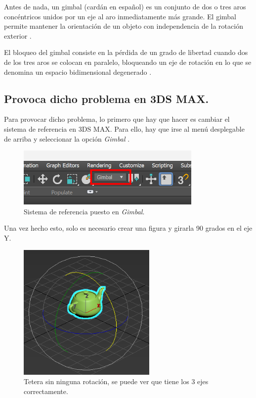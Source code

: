 \documentclass{article}
\begin{document}
Antes de nada, un gimbal (cardán en español) es un conjunto de dos o tres aros concéntricos unidos por un eje al aro inmediatamente más grande. El gimbal permite mantener la orientación de un objeto con independencia de la rotación exterior \cite{eswiki:131649196}.

El bloqueo del gimbal consiste en la pérdida de un grado de libertad cuando dos de los tres aros se colocan en paralelo, bloqueando un eje de rotación en lo que se denomina un espacio bidimensional degenerado \cite{eswiki:119169170}.

\subsection{Provoca dicho problema en 3DS MAX.}

Para provocar dicho problema, lo primero que hay que hacer es cambiar el sistema de referencia en 3DS MAX. Para ello, hay que irse al menú desplegable de arriba y seleccionar la opción \textit{Gimbal} \cite{explicacion}.

\begin{figure}[H]
    \centering
    \includegraphics[width=0.8\textwidth]{imagenes/6-1.png}
    \caption{Sistema de referencia puesto en \textit{Gimbal}.}
\end{figure}

Una vez hecho esto, solo es necesario crear una figura y girarla 90 grados en el eje Y.

\begin{figure}[H]
    \centering
    \includegraphics[width=0.6\textwidth]{imagenes/6-2.png}
    \caption{Tetera sin ninguna rotación, se puede ver que tiene los 3 ejes correctamente.}
\end{figure}
\end{document}

